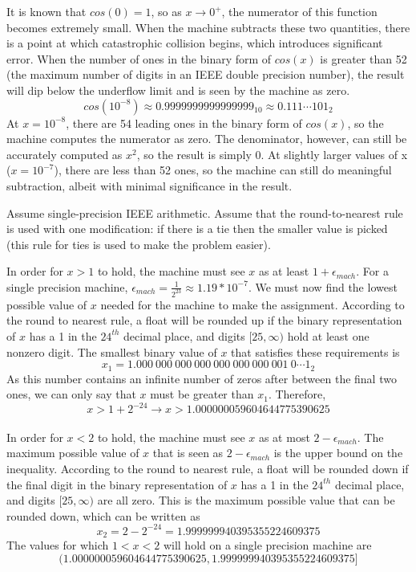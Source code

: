 	It is known that $cos(0) = 1$, so as $x \rightarrow 0^+$, the numerator of this function becomes extremely small. When the machine
	subtracts these two quantities, there is a point at which catastrophic collision begins, which introduces significant error. When the
	number of ones in the binary form of $cos(x)$ is greater than 52 (the maximum number of digits in an IEEE double precision number),
	the result will dip below the underflow limit and is seen by the machine as zero.
	$$cos(10^{-8}) \approx 0.9999999999999999_{10} \approx 0.111\cdots101_2$$
	At $x=10^{-8}$, there are 54 leading ones in the binary form of $cos(x)$, so the machine computes the numerator as zero. The
	denominator, however, can still be accurately computed as $x^2$, so the result is simply 0.
	At slightly
	larger values of x ($x=10^{-7}$), there are less than 52 ones, so the machine can still do meaningful subtraction, albeit with minimal
	significance in the result.

\item
Assume single-precision IEEE arithmetic. Assume that the round-to-nearest rule is used with one modification: if there is a tie then the smaller value is picked (this rule for ties is used to make the problem easier).
\benum
\item
	In order for $x>1$ to hold, the machine must see $x$ as at least $1+\epsilon_{mach}$. For a single precision machine, $\epsilon_{mach}
	=\frac{1}{2^{23}} \approx 1.19*10^{-7}$. We must now find the lowest possible value of $x$ needed for the machine to make the
	assignment. According to the round to nearest rule, a float will be rounded up if the binary representation of $x$ has a 1 in the
	$24^{th}$ decimal place, and digits $[25, \infty)$ hold at least one nonzero digit. The smallest binary value of $x$ that satisfies
	these requirements is $$x_1 = 1.000\ 000\ 000\ 000\ 000\ 000\ 000\ 001\ 0\cdots1_2$$
	As this number contains an infinite number of zeros after between the final two ones, we can only say that $x$ must be greater
	than $x_1$. Therefore,
	$$x>1+2^{-24} \rightarrow x>1.000000059604644775390625$$\\

	In order for $x<2$ to hold, the machine must see $x$ as at most $2-\epsilon_{mach}$. The maximum possible value of $x$ that is seen
	as $2-\epsilon_{mach}$ is the upper bound on the inequality. According to the round to nearest rule, a float will be rounded down if
	the final digit in the binary representation of $x$ has a 1 in the $24^{th}$ decimal place, and digits $[25, \infty)$ are all zero.
	This is the maximum possible value that can be rounded down, which can be written as
	$$x_2 = 2-2^{-24} = 1.999999940395355224609375$$
The values for which $1<x<2$ will hold on a single precision machine are $$(1.000000059604644775390625, 1.999999940395355224609375]$$ \\

